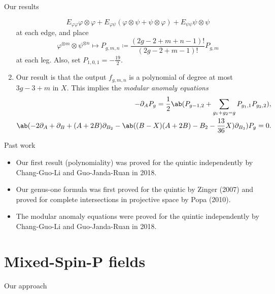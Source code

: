 \documentclass[10pt]{beamer}
\newcommand{\1}{\mathbf{1}}
\newcommand{\2}{\mathbf{2}}
\newcommand{\3}{\mathbf{3}}
\theoremstyle{definition}
\theoremstyle{remark}
\theoremstyle{plain}
\theoremstyle{definition}
\theoremstyle{remark}
\begin{document}
\begin{frame}{Our results}
\begin{enumerate}
    \[ E_{\varphi\varphi}\varphi\otimes \varphi + E_{\varphi\psi}(\varphi \otimes \psi + \psi \otimes \varphi) + E_{\psi\psi} \psi \otimes \psi \]
    at each edge, and place
    \[ \varphi^{\otimes m} \otimes \psi^{\otimes n} \mapsto P_{g,m,n} \coloneqq \frac{(2g-2+m+n-1)!}{(2g-2+m-1)!} P_{g,m} \]
    at each leg. Also, set $P_{1,0,1} = -\frac{19}{2}$.
    \item Our result is that the output $f_{g,m,n}$ is a polynomial of degree at most $3g-3+m$ in $X$. This implies the \textit{modular anomaly equations}
    \footnotesize
    \begin{align*}
      - \partial_{A} P_g = \frac{1}{2} \ab(P_{g-1,2} + \sum_{g_1+g_2 = g} P_{g_1, 1} P_{g_2, 2}),  \\
      \ab(-2 \partial_{A} + \partial_{B} + (A+2B) \partial_{B_2} - \ab((B-X)(A+2B)-B_2-\frac{13}{36} X)\partial_{B_3})P_g = 0.
    \end{align*}
  \end{enumerate}
\end{frame}

\begin{frame}{Past work}
  \begin{itemize}[<+->]
    \item Our first result (polynomiality) was proved for the quintic independently by Chang-Guo-Li and Guo-Janda-Ruan in 2018.
    \item Our genus-one formula was first proved for the quintic by Zinger (2007) and proved for complete intersections in projective space by Popa (2010).
    \item The modular anomaly equations were proved for the quintic independently by Chang-Guo-Li and Guo-Janda-Ruan in 2018.
  \end{itemize}
\end{frame}

\section{Mixed-Spin-P fields}
\begin{frame}{Our approach}

\end{frame}
\end{document}
